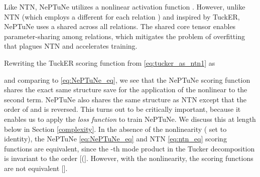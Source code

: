 \documentclass[11pt]{article}
\begin{document}
Like NTN, NePTuNe utilizes a nonlinear activation function .
However, unlike NTN (which employs a different  for each relation ) and inspired by TuckER, NePTuNe uses a shared  across all relations.  
The shared core tensor  enables parameter-sharing among relations, which mitigates the problem of overfitting that plagues NTN and accelerates training.


Rewriting the TuckER scoring function from \eqref{eq:tucker_as_ntn1} as

and comparing to \eqref{eq:NePTuNe_eq}, we see that the NePTuNe scoring function shares the exact same structure save for the application of the nonlinear  to the second term.
NePTuNe also shares the same structure as NTN except that the order of  and  is reversed.
This turns out to be critically important, because it enables us to apply the {\em  loss function} to train NePTuNe.
We discuss this at length below in Section \ref{complexity}. 
In the absence of the nonlinearity ( set to identity), the NePTuNe \eqref{eq:NePTuNe_eq} and NTN \eqref{eq:ntn_eq} scoring functions are equivalent, since the -th mode product in the Tucker decomposition is invariant to the order [(]. 
However, with the nonlinearity, the scoring functions are not equivalent [].






\begin{table*}[t]
\centering
{}
\caption{Scoring function and space complexity (significant terms) of state-of-the-art linear link prediction models in comparison to NePTuNe. 
Information gathered from \protect\cite{balavzevic2019tucker}.}
\label{tab:results_space}
\end{table*}
\end{document}
